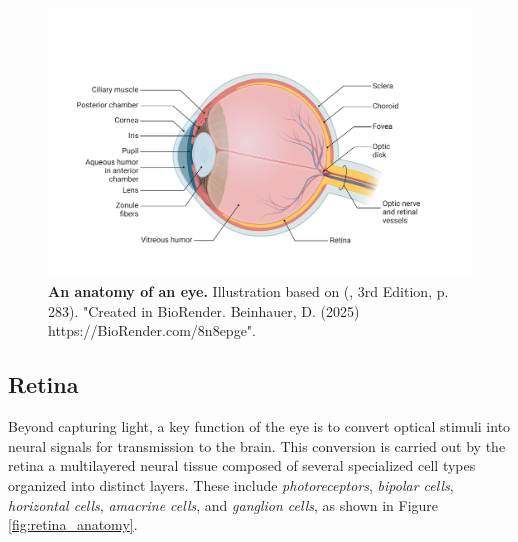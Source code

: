 \begin{figure}
    \centering
    \includegraphics[width=\linewidth]{img/eye.pdf}
    \caption{\textbf{An anatomy of an eye.} Illustration based on (\citet{bear2020neuroscience}, 3rd Edition, p. 283). "Created in BioRender. Beinhauer, D. (2025) https://BioRender.com/8n8epge".}
    \label{fig:eye}
\end{figure}


\subsection{Retina}
\label{subsec:retina}

Beyond capturing light, a key function of the eye is to convert optical stimuli into neural signals for transmission to the brain. This conversion is carried out by the retina a multilayered neural tissue composed of several specialized cell types organized into distinct layers. These include \emph{photoreceptors}, \emph{bipolar cells}, \emph{horizontal cells}, \emph{amacrine cells}, and \emph{ganglion cells}, as shown in Figure \ref{fig:retina_anatomy}.


